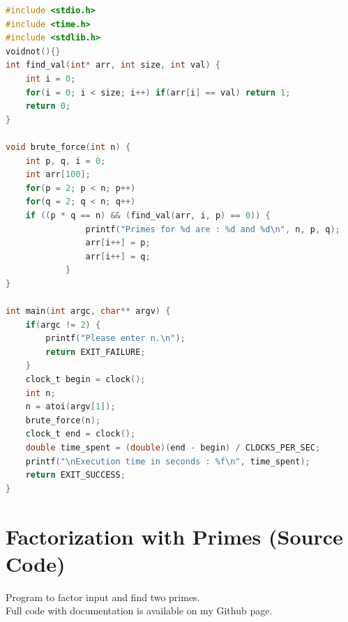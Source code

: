 \documentclass[a4paper, 12pt]{article}
\begin{document}
\begin{lstlisting}[language=C, caption=Source Code of rsa-with-integers.c]
#include <stdio.h>
#include <time.h>
#include <stdlib.h>
voidnot(){}
int find_val(int* arr, int size, int val) {
    int i = 0;
    for(i = 0; i < size; i++) if(arr[i] == val) return 1;
    return 0;
}

void brute_force(int n) {
    int p, q, i = 0;
    int arr[100];
    for(p = 2; p < n; p++)
    for(q = 2; q < n; q++)
    if ((p * q == n) && (find_val(arr, i, p) == 0)) {
                printf("Primes for %d are : %d and %d\n", n, p, q);
                arr[i++] = p;
                arr[i++] = q;
            }
}

int main(int argc, char** argv) {
    if(argc != 2) {
        printf("Please enter n.\n");
        return EXIT_FAILURE;
    }
    clock_t begin = clock();
    int n;
    n = atoi(argv[1]);
    brute_force(n);
    clock_t end = clock();
    double time_spent = (double)(end - begin) / CLOCKS_PER_SEC;
    printf("\nExecution time in seconds : %f\n", time_spent);
    return EXIT_SUCCESS;
}
\end{lstlisting}
\newpage
\section{Factorization with Primes (Source Code)}
\label{primes}
Program to factor input and find two primes.\\

Full code with documentation is available on my Github page.\cite{github}\\
\end{document}
